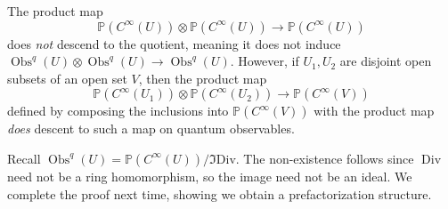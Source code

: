 \begin{lemma}[\cite{cg1} 2.3.1]\label{?}
	The product map
	\[
		\mathbb{P} (C^\infty (U))\otimes \mathbb{P} (C^\infty (U))\to \mathbb{P} (C^\infty (U))
	\]
	does \emph{not} descend to the quotient, meaning it does not induce $\operatorname{Obs} ^q(U)\otimes \operatorname{Obs} ^q(U)\to \operatorname{Obs} ^q(U)$. However, if $U_1,U_2$ are disjoint open subsets of an open set $V$, then the product map
	\[
		\mathbb{P} (C^\infty (U_1))\otimes \mathbb{P} (C^\infty (U_2))\to \mathbb{P} (C^\infty (V))
	\]
	defined by composing the inclusions into $\mathbb{P} (C^\infty (V))$ with the product map \emph{does} descent to such a map on quantum observables.
\end{lemma}
Recall $\operatorname{Obs} ^q(U)=\mathbb{P} (C^\infty (U)) / \Im \mathrm{Div} $. The non-existence follows since $\operatorname{Div} $ need not be a ring homomorphism, so the image need not be an ideal. We complete the proof next time, showing we obtain a prefactorization structure.

